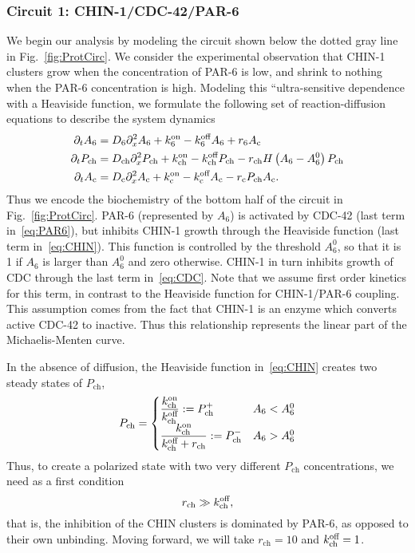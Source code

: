 \documentclass[11pt]{article}
\newcommand{\CDC}[1]{#1_{\text{c}}}
\newcommand{\6}[1]{#1_{\text{6}}}
\newcommand{\3}[1]{#1_{\text{3}}}
\newcommand{\CHIN}[1]{#1_{\text{ch}}}
\begin{document}
\subsubsection{Circuit 1: CHIN-1/CDC-42/PAR-6}
We begin our analysis by modeling the circuit shown below the dotted gray line in Fig.\ \ref{fig:ProtCirc}. We consider the experimental observation \cite{sailer2015dynamic} that CHIN-1 clusters grow when the concentration of PAR-6 is low, and shrink to nothing when the PAR-6 concentration is high. Modeling this ``ultra-sensitive dependence with a Heaviside function, we formulate the following set of reaction-diffusion equations to describe the system dynamics
\begin{subequations}
\label{eq:RxnDiffMod}
\begin{align}
\label{eq:PAR6}
\Dt \6{A} &= \6{D} \Dx^2 \6{A}+\6{\kon}-\6{\koff}\6{A} + \6{r} \CDC{A} \\
\label{eq:CHIN}
\Dt \CHIN{P}&= \CHIN{D} \Dx^2 \CHIN{P} + \CHIN{\kon} - \CHIN{\koff} \CHIN{P}- \CHIN{r} H\left(\6{A}-\6{A}^0\right) \CHIN{P}\\
\label{eq:CDC}
\Dt \CDC{A} &=\CDC{D} \Dx^2 \CDC{A} + \CDC{\kon}-\CDC{\koff}\CDC{A} - \CDC{r} \CHIN{P}\CDC{A}. 
\end{align}
\end{subequations}
Thus we encode the biochemistry of the bottom half of the circuit in Fig.\ \ref{fig:ProtCirc}. PAR-6 (represented by $A_6$) is activated by CDC-42 (last term in\ \eqref{eq:PAR6}), but inhibits CHIN-1 growth through the Heaviside function (last term in\ \eqref{eq:CHIN}). This function is controlled by the threshold $\6{A}^0$, so that it is 1 if $\6{A}$ is larger than $\6{A}^0$ and zero otherwise. CHIN-1 in turn inhibits growth of CDC through the last term in\ \eqref{eq:CDC}. Note that we assume first order kinetics for this term, in contrast to the Heaviside function for CHIN-1/PAR-6 coupling. This assumption comes from the fact that CHIN-1 is an enzyme which converts active CDC-42 to inactive. Thus this relationship represents the linear part of the Michaelis-Menten curve. 

In the absence of diffusion, the Heaviside function in\ \eqref{eq:CHIN} creates two steady states of $\CHIN{P}$, 
\begin{equation}
\CHIN{P} = \begin{cases} 
\displaystyle{\frac{\CHIN{\kon}}{\CHIN{\koff}}}:=\CHIN{P}^+  & \6{A} < \6{A}^0 \\[6 pt]
\displaystyle{\frac{\CHIN{\kon}}{\CHIN{\koff}+\CHIN{r}}}:=\CHIN{P}^- & \6{A} > \6{A}^0 
\end{cases}
\end{equation}
Thus, to create a polarized state with two very different $\CHIN{P}$ concentrations, we need as a first condition
\begin{equation}
\label{eq:ChinCondition}
\CHIN{r} \gg \CHIN{\koff},
\end{equation}
that is, the inhibition of the CHIN clusters is dominated by PAR-6, as opposed to their own unbinding. Moving forward, we will take $\CHIN{r}=10$ and $\CHIN{\koff}=1$. 
\end{document}
